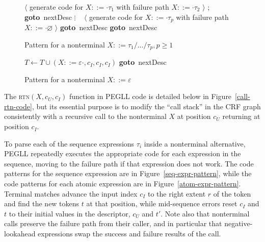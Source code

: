 \documentclass{article}
\newcommand{\fail}{\mathsf{fail}}
\newcommand{\Goto}[1]{\textbf{goto}~#1}
\begin{document}
\begin{figure}
\caption[Non-terminal code pattern]{Pattern for a nonterminal $X ::= \tau_1 / \ldots / \tau_p, p \geq 1$} \label{nt-pattern}
\begin{algorithmic}
	\State $\langle$ generate code for $X ::= \cdot \tau_1$ with failure path $X ::= \cdot \tau_2$ $\rangle$
	\State {}; \Goto{nextDesc}
\EndCase
\State $\vdots$
\State ~
	\State $\langle$ generate code for $X ::= \cdot \tau_p$ with failure path $X ::= \cdot \varnothing$ $\rangle$
	\State {} \Goto{nextDesc}
\EndCase
{}
	\State \Call{rtn}{$X$, $c_U$, $\fail$} \Goto{nextDesc}
\EndCase
\end{algorithmic}
\end{figure}

\begin{figure}
\caption[Empty nonterminal code pattern]{Pattern for a nonterminal $X ::= \varepsilon$} \label{empty-nt-pattern}
\begin{algorithmic}
	\State $T \gets T \cup {(X ::= \varepsilon \cdot, c_I, c_I, c_I)}$
	\State {} \Goto{nextDesc}
\EndCase
\end{algorithmic}
\end{figure}

The \textsc{rtn}$(X, c_U, c_I)$ function in PEGLL code is detailed below in Figure~\ref{call-rtn-code}, but its essential purpose is to modify the ``call stack'' in the CRF graph consistently with a recursive call to the nonterminal $X$ at position $c_U$ returning at position $c_I$.

To parse each of the sequence expressions $\tau_i$ inside a nonterminal alternative, PEGLL repeatedly executes the appropriate code for each expression in the sequence, moving to the failure path if that expression does not work. 
The code patterns for the sequence expression are in Figure~\ref{seq-expr-pattern}, while the code patterns for each atomic expression are in Figure~\ref{atom-expr-pattern}. 
Terminal matches advance the input index $c_I$ to the right extent $r$ of the token and find the new tokens $t$ at that position, while mid-sequence errors reset $c_I$ and $t$ to their initial values in the descriptor, $c_U$ and $t'$.
Note also that nonterminal calls preserve the failure path from their caller, and in particular that negative-lookahead expressions swap the success and failure results of the call.
\end{document}
